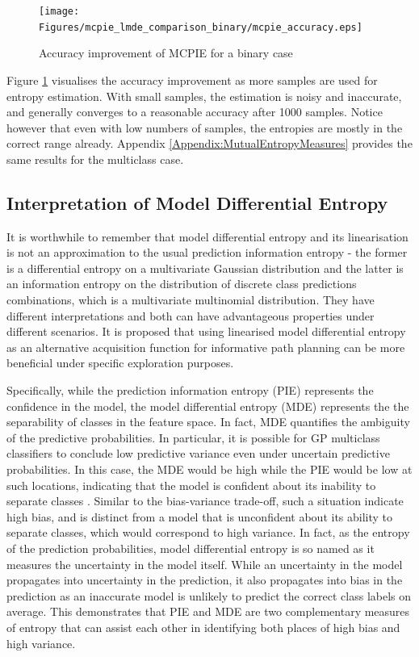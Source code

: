 			\begin{figure}[!htbp]
				\centering
					\texttt{[image: Figures/mcpie\_lmde\_comparison\_binary/mcpie\_accuracy.eps]}
				\caption{Accuracy improvement of MCPIE for a binary case}
				\label{Figure:mcpie_accuracy_binary}
			\end{figure}
				
			Figure \ref{Figure:mcpie_accuracy_binary} visualises the accuracy improvement as more samples are used for entropy estimation. With small samples, the estimation is noisy and inaccurate, and generally converges to a reasonable accuracy after 1000 samples. Notice however that even with low numbers of samples, the entropies are mostly in the correct range already. Appendix \ref{Appendix:MutualEntropyMeasures} provides the same results for the multiclass case.
			
		\subsection{Interpretation of Model Differential Entropy}
		\label{InformativeSeafloorExploration:ComparisonMutualEntropyMeasures:InterpretationMDE}
		
			It is worthwhile to remember that model differential entropy and its linearisation is not an approximation to the usual prediction information entropy - the former is a differential entropy on a multivariate Gaussian distribution and the latter is an information entropy on the distribution of discrete class predictions combinations, which is a multivariate multinomial distribution. They have different interpretations and both can have advantageous properties under different scenarios. It is proposed that using linearised model differential entropy as an alternative acquisition function for informative path planning can be more beneficial under specific exploration purposes.
			
			Specifically, while the prediction information entropy (PIE) represents the confidence in the model, the model differential entropy (MDE) represents the the separability of classes in the feature space. In fact, MDE quantifies the ambiguity of the predictive probabilities. In particular, it is possible for GP multiclass classifiers to conclude low predictive variance even under uncertain predictive probabilities. In this case, the MDE would be high while the PIE would be low at such locations, indicating that the model is confident about its inability to separate classes \citep{AsherBender}. Similar to the bias-variance trade-off, such a situation indicate high bias, and is distinct from a model that is unconfident about its ability to separate classes, which would correspond to high variance. In fact, as the entropy of the prediction probabilities, model differential entropy is so named as it measures the uncertainty in the model itself. While an uncertainty in the model propagates into uncertainty in the prediction, it also propagates into bias in the prediction as an inaccurate model is unlikely to predict the correct class labels on average. This demonstrates that PIE and MDE are two complementary measures of entropy that can assist each other in identifying both places of high bias and high variance.
			
